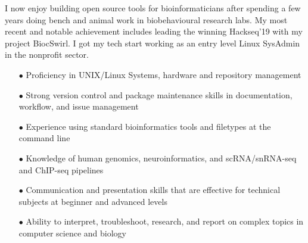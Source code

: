 \documentclass[9pt]{developercv} %
\begin{document}
\vspace{0.15cm}

\begin{minipage}[t]{0.5\textwidth} %
	\vspace{-\baselineskip} %
	
I now enjoy building open source tools for bioinformaticians after spending a few years doing bench and animal work in biobehavioural research labs. My most recent and notable achievement includes leading the winning Hackseq'19 with my project BiocSwirl. I got my tech start working as an entry level Linux SysAdmin in the nonprofit sector.
\end{minipage}
\hfill\hfill\hfill
\begin{minipage}[t]{0.25\textwidth} %
	\vspace{-\baselineskip} %
	\begin{barchart}{5.25}
	\end{barchart}

\end{minipage}
\begin{minipage}[t]{0.2\textwidth} %
	\vspace{-\baselineskip} %
	\begin{barchart}{5.25}
	\end{barchart}	
\end{minipage}
\vspace{-.5em}
\vspace{-.5em}
\begin{flushleft}
\vspace{-\topsep}
	\begin{itemize}
    \itemsep-.3em
  \item[$\bullet$] {Proficiency in UNIX/Linux Systems, hardware and repository management}
  \item[$\bullet$] {Strong version control and package maintenance skills in documentation, workflow, and issue management}
  \item[$\bullet$] {Experience using standard bioinformatics tools and filetypes at the command line}  
  \item[$\bullet$] {Knowledge of human genomics, neuroinformatics, and scRNA/snRNA-seq and ChIP-seq pipelines}
  \item[$\bullet$] {Communication and presentation skills that are effective for technical subjects at beginner and advanced levels}
  \item[$\bullet$] {Ability to interpret, troubleshoot, research, and report on complex topics in computer science and biology}
	\end{itemize}
\end{flushleft}
\end{document}
